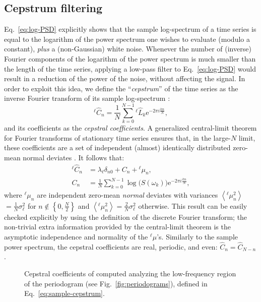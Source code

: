 \subsection{Cepstrum filtering}
Eq.~\eqref{eq:log-PSD} explicitly shows that the sample log-spectrum of a time series is equal to the logarithm of the power spectrum one wishes to evaluate (modulo a constant), \emph{plus} a (non-Gaussian) white noise. Whenever the number of (inverse) Fourier components of the logarithm of the power spectrum is much smaller than the length of the time series, applying a low-pass filter to Eq.~\eqref{eq:log-PSD} would result in a reduction of the power of the noise, without affecting the signal. 
In order to exploit this idea, we define the ``\emph{cepstrum}'' of the time series as the inverse Fourier transform of its sample log-spectrum \citep{Childers1977}:
\begin{equation}
  ^{\ell\!} \hat C_{n} = \frac{1}{N}\sum_{k=0}^{N-1} {^{\ell\!} \hat L_{k}} \mathrm{e}^{-2\pi i\frac{kn}{N}}, \label{eq:sample-cepstrum}
\end{equation}
and its coefficients as the \emph{cepstral coefficients}. 
A generalized central-limit theorem for Fourier transforms of stationary time series ensures that, in the large-$N$ limit, these coefficients are a set of independent (almost) identically distributed zero-mean normal deviates \citep{Anderson1994,Peligrad2010}. It follows that:
\begin{align}
    ^{\ell\!} \hat  C_{n} &= \lambda_{\ell} \delta_{n0} + C_{n} +  {^{{\ell\!}}{\mu}}_{n},  \label{eq:cepstrogram}\\
    C_{n} &= \frac{1}{N}\sum_{k=0}^{N-1} \log\bigl (S(\omega_k) \bigr ) \mathrm{e}^{-2\pi i\frac{kn}{N}}, \label{eq:C-nohat}
\end{align}
where $^{{\ell\!}}{\mu}_{n}$ are independent zero-mean \emph{normal} deviates with variances $\left\langle {^{{\ell\!}}{\mu}_{n}^2}  \right\rangle$ $=\frac{1}{N}\sigma_\ell^2$ for $n\notin\left\{ 0,\frac{N}{2}\right\}$ and $\left\langle ^{{\ell\!}}{\mu}_{n}^{2}\right\rangle =\frac{2}{N}\sigma_{\ell}^{2}$
otherwise.
This result can be easily checked explicitly by using the definition of the discrete Fourier transform; the non-trivial extra information provided by the central-limit theorem is the asymptotic independence and normality of the $^{\ell}\mu$'s. Similarly to the sample power spectrum, the cepstral coefficients are real, periodic, and even: $\hat C_{n} = \hat C_{N-n}$. 

\begin{figure}[!htb]
    \centering
    \caption{Cepstral coefficients of  computed analyzing the low-frequency region of the periodogram (see Fig.~\ref{fig:periodograms}), defined in Eq.~\eqref{eq:sample-cepstrum}. }
    \label{fig:cepstrums}
\end{figure}

